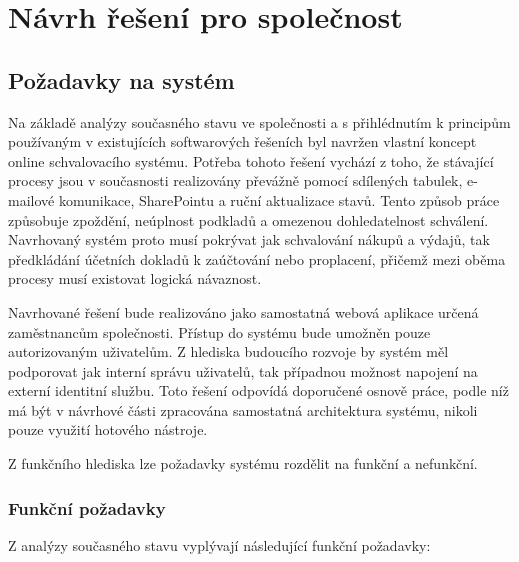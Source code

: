 \chapter{Návrh řešení pro společnost}


\section{Požadavky na systém}

Na základě analýzy současného stavu ve společnosti a s přihlédnutím k principům používaným v existujících softwarových řešeních byl navržen vlastní koncept online schvalovacího systému. Potřeba tohoto řešení vychází z toho, že stávající procesy jsou v současnosti realizovány převážně pomocí sdílených tabulek, e-mailové komunikace, SharePointu a ruční aktualizace stavů. Tento způsob práce způsobuje zpoždění, neúplnost podkladů a omezenou dohledatelnost schválení. Navrhovaný systém proto musí pokrývat jak schvalování nákupů a výdajů, tak předkládání účetních dokladů k zaúčtování nebo proplacení, přičemž mezi oběma procesy musí existovat logická návaznost.

Navrhované řešení bude realizováno jako samostatná webová aplikace určená zaměstnancům společnosti. Přístup do systému bude umožněn pouze autorizovaným uživatelům. Z hlediska budoucího rozvoje by systém měl podporovat jak interní správu uživatelů, tak případnou možnost napojení na externí identitní službu. Toto řešení odpovídá doporučené osnově práce, podle níž má být v návrhové části zpracována samostatná architektura systému, nikoli pouze využití hotového nástroje.

Z funkčního hlediska lze požadavky systému rozdělit na funkční a nefunkční.


\subsection{Funkční požadavky}

Z analýzy současného stavu vyplývají následující funkční požadavky:

